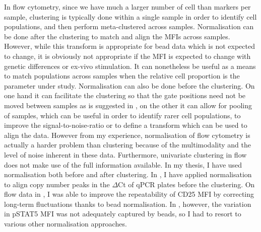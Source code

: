 In flow cytometry, since we have much a larger number of cell than markers per sample, clustering is typically done within a single sample in order to identify cell populations, and then perform meta-clustered across samples.
Normalisation can be done after the clustering to match and align the MFIs across samples.
However, while this transform is appropriate for bead data which is not expected to change, it is obviously not appropriate if the MFI is expected to change with genetic differences or ex-vivo stimulation.
It can nonetheless be useful as a means to match populations across samples when the relative cell proportion is the parameter under study.
Normalisation can also be done before the clustering.
On one hand it can facilitate the clustering so that the gate positions need not be moved between samples as is suggested in \citet{Hahne:2009hl}, on the other it can allow for pooling of samples, which can be useful in order to identify rarer cell populations, to improve the signal-to-noise-ratio or to define a transform which can be used to align the data.
However from my experience, normalisation of flow cytometry is actually a harder problem than clustering because of the multimodality and the level of noise inherent in these data.
Furthermore, univariate clustering in flow does not make use of the full information available. 
In my thesis, I have used normalisation both before and after clustering.
In , I have applied normalisation to align copy number peaks in the $\Delta$Ct of qPCR plates before the clustering.
On flow data in , I was able to improve the repeatability of CD25 MFI by correcting long-term
fluctuations thanks to bead normalisation.
In , however, the variation in pSTAT5 MFI was not adequately captured by beads, so I had to resort to various other normalisation approaches.

